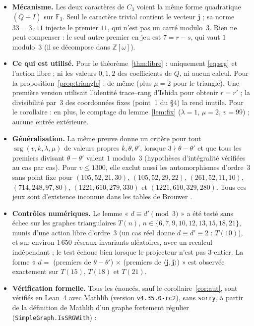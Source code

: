 \documentclass[11pt,a4paper]{article}
\theoremstyle{remark}
\newcommand{\Z}{\mathbb{Z}}
\newcommand{\F}{\mathbb{F}}
\newcommand{\one}{\mathbf{j}}
\newcommand{\srg}{\operatorname{srg}}
\begin{document}
\begin{itemize}[leftmargin=*]
\item \textbf{Mécanisme.} Les deux caractères de $C_3$ voient la même forme quadratique $(\bar Q+I)$ sur $\F_3$. Seul le
caractère trivial contient le vecteur $\one$ ; sa norme $33=3\cdot11$ injecte le premier $11$, qui n'est pas un carré modulo~3.
Rien ne peut compenser : le seul autre premier en jeu est $7=r-s$, qui vaut $1$ modulo~3 (il se décompose dans $\Z[\omega]$).
\item \textbf{Ce qui est utilisé.} Pour le théorème~\ref{thm:libre} : uniquement \eqref{eq:srg} et l'action libre ; ni les valeurs
$0,1,2$ des coefficients de $Q$, ni aucun calcul. Pour la proposition~\ref{prop:triangle} : de même (plus $\mu=2$ pour le
triangle). Une première version utilisait l'identité trace--rang d'Ishida pour obtenir $r=r'$ ; la divisibilité par~3 des
coordonnées fixes (point~1 du §4) la rend inutile. Pour le corollaire : en plus, le comptage du lemme~\ref{lem:fix}
($\lambda=1$, $\mu=2$, $v=99$) ; aucune entrée extérieure.
\item \textbf{Généralisation.} La même preuve donne un critère pour tout $\srg(v,k,\lambda,\mu)$ de valeurs propres $k,\theta,\theta'$,
lorsque $3\nmid\theta-\theta'$ et que tous les premiers divisant $\theta-\theta'$ valent $1$ modulo~3 (hypothèses d'intégralité
vérifiées au cas par cas). Pour $v\le1300$, elle exclut
aussi les automorphismes d'ordre~3 sans point fixe pour $(105,52,21,30)$, $(105,52,29,22)$, $(261,52,11,10)$, $(714,248,97,80)$,
$(1221,610,279,330)$ et $(1221,610,329,280)$. Tous ces jeux sont d'existence inconnue dans les tables de Brouwer \cite{Br}.
\item \textbf{Contrôles numériques.} Le lemme « $d\equiv d'\pmod3$ » a été testé sans échec sur les graphes triangulaires
$T(n)$, $n\in\{6,7,9,10,12,13,15,18,21\}$, munis d'une action libre d'ordre~3 (un cas réel donne $d\equiv d'\equiv2$ : $T(10)$),
et sur environ 1\,650 réseaux invariants aléatoires, avec un recalcul indépendant ; le test échoue bien lorsque le projecteur
n'est pas 3-entier. La forme « $d=$ (premiers de $\theta-\theta'$) $\times$ (premiers de $\langle\one,\one\rangle$) » est
observée exactement sur $T(15)$, $T(18)$ et $T(21)$.
\item \textbf{Vérification formelle.} Tous les énoncés, sauf le corollaire~\ref{cor:aut}, sont vérifiés en Lean~4 \cite{dMU21}
avec Mathlib \cite{Mat20} (version \texttt{v4.35.0-rc2}), sans \texttt{sorry}, à partir de la définition de Mathlib d'un graphe
fortement régulier (\texttt{SimpleGraph.\allowbreak IsSRGWith}) :

\end{itemize}
\end{document}
